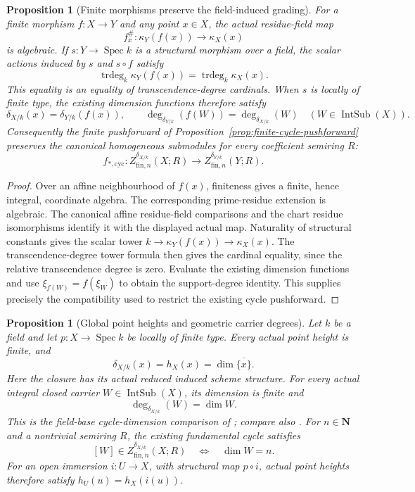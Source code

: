 \documentclass[11pt]{article}
\newtheorem{proposition}[theorem]{Proposition}
\theoremstyle{definition}
\theoremstyle{remark}
\DeclareMathOperator{\Spec}{Spec}
\begin{document}
\begin{proposition}[Finite morphisms preserve the field-induced grading]
\label{prop:finite-field-grading}
For a finite morphism \(f:X\to Y\) and any point \(x\in X\), the
actual residue-field map
\[
 f_x^\#: \kappa_Y(f(x))\longrightarrow\kappa_X(x)
\]
is algebraic. If \(s:Y\to\Spec k\) is a structural morphism over a
field, the scalar actions induced by \(s\) and \(s\circ f\) satisfy
\[
 \operatorname{trdeg}_k\kappa_Y(f(x))
   =\operatorname{trdeg}_k\kappa_X(x).
\]
This equality is an equality of transcendence-degree cardinals.
When \(s\) is locally of finite type, the existing dimension functions
therefore satisfy
\[
 \delta_{X/k}(x)=\delta_{Y/k}(f(x)),
 \qquad
 \deg_{\delta_{Y/k}}(f(W))=\deg_{\delta_{X/k}}(W)
 \quad(W\in\operatorname{IntSub}(X)).
\]
Consequently the finite pushforward of
Proposition~\ref{prop:finite-cycle-pushforward} preserves the canonical
homogeneous submodules for every coefficient semiring \(R\):
\[
 f_{*,\mathrm{cyc}}:
 Z^{\delta_{X/k}}_{\mathrm{fin},n}(X;R)
   \longrightarrow Z^{\delta_{Y/k}}_{\mathrm{fin},n}(Y;R).
\]
\end{proposition}

\begin{proof}
Over an affine neighbourhood of \(f(x)\), finiteness gives a finite,
hence integral, coordinate algebra. The corresponding prime-residue
extension is algebraic. The canonical affine residue-field comparisons
and the chart residue isomorphisms identify it with the displayed actual
map. Naturality of structural constants gives the scalar tower
\(k\to\kappa_Y(f(x))\to\kappa_X(x)\). The transcendence-degree
tower formula \cite{StacksTranscendenceDegreeTower} then gives the cardinal
equality, since the relative transcendence degree is zero. Evaluate the
existing dimension functions and use \(\xi_{f(W)}=f(\xi_W)\) to obtain
the support-degree identity. This supplies precisely the compatibility
used to restrict the existing cycle pushforward.
\end{proof}

\begin{proposition}[Global point heights and geometric carrier degrees]
\label{prop:global-field-carrier-dimension}
Let \(k\) be a field and let \(p:X\to\Spec k\) be locally of
finite type. Every actual point height is finite, and
\[
  \delta_{X/k}(x)=h_X(x)=\dim\overline{\{x\}}.
\]
Here the closure has its actual reduced induced scheme structure.
For every actual integral closed carrier
\(W\in\operatorname{IntSub}(X)\), its dimension is finite and
\[
  \deg_{\delta_{X/k}}(W)=\dim W.
\]
This is the field-base cycle-dimension comparison of
\cite{StacksCycleDimensionComparison}; compare also
\cite{StacksAlgebraicSchemeDimension}.
For \(n\in\mathbf N\) and a nontrivial semiring \(R\), the existing
fundamental cycle satisfies
\[
  [W]\in Z^{\delta_{X/k}}_{\mathrm{fin},n}(X;R)
    \quad\Longleftrightarrow\quad\dim W=n.
\]
For an open immersion \(i:U\to X\), with structural map
\(p\circ i\), actual point heights therefore satisfy
\(h_U(u)=h_X(i(u))\).
\end{proposition}
\end{document}

